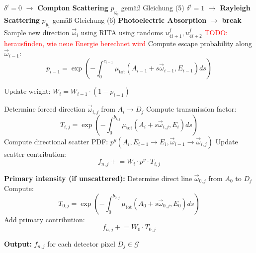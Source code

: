 \begin{algorithm}[H]
\begin{algorithmic}[1]
        \State $\delta^i=0$ $\to$ \textbf{Compton Scattering}
        \State $p_{y_0}$ gemäß Gleichung (5)
        \State $\delta^i=1$ $\to$ \textbf{Rayleigh Scattering}
        \State $p_{y_1}$ gemäß Gleichung (6)
    \Else 
        \State \textbf{Photoelectric Absorption} $\to$ \textbf{break}
    \EndIf
    \State Sample new direction $\vec{\omega}_i$ using RITA using randoms $u^j_{4i+1}, u^j_{4i+2}$
    \State \textcolor{red}{TODO: herausfinden, wie neue Energie berechnet wird}
    \State Compute escape probability along $\vec{\omega}_{i-1}$:
    \[
    p_{i-1} = \exp\left(-\int_0^{c_{i-1}} \mu_{\text{tot}}(A_{i-1} + s\vec{\omega}_{i-1}, E_{i-1}) ds\right)
    \]
    
    \State Update weight: $W_i = W_{i-1} \cdot (1 - p_{i-1})$

        \State Determine forced direction $\vec{\omega}_{i,j}$ from $A_i \to D_j$
        \State Compute transmission factor:
        \[
        T_{i,j} = \exp\left(-\int_0^{b_{i,j}} \mu_{\text{tot}}(A_i + s\vec{\omega}_{i,j}, E_i) ds\right)
        \]
        \State Compute directional scatter PDF: $p^y(A_i, E_{i-1} \rightarrow E_i, \vec{\omega}_{i-1} \rightarrow \vec{\omega}_{i,j})$
        \State Update scatter contribution:
        \[
        f_{n,j} \mathrel{+}= W_i \cdot p^y \cdot T_{i,j}
        \]
    \EndFor

\EndFor

\vspace{.25cm}
\State \textbf{Primary intensity (if unscattered):}
    \State Determine direct line $\vec{\omega}_{0,j}$ from $A_0$ to $D_j$
    \State Compute:
    \[
    T_{0,j} = \exp\left(-\int_0^{b_{0,j}} \mu_{\text{tot}}(A_0 + s\vec{\omega}_{0,j}, E_0) ds\right)
    \]
    \State Add primary contribution:
    \[
    f_{n,j} \mathrel{+}= W_0 \cdot T_{0,j}
    \]
\EndFor

\State \textbf{Output:} $f_{n,j}$ for each detector pixel $D_j \in \mathcal{G}$

\end{algorithmic}
\end{algorithm}